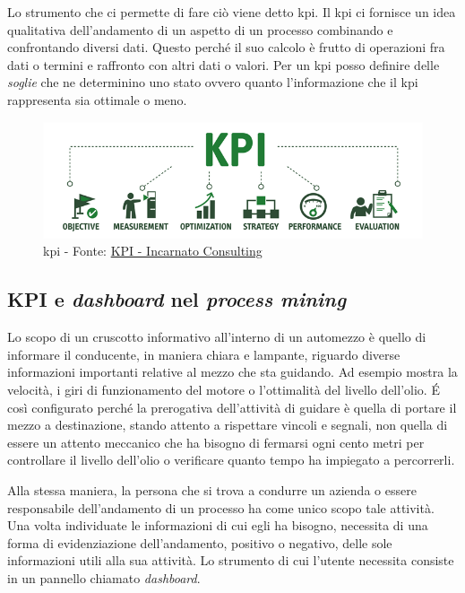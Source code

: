 Lo strumento che ci permette di fare ciò viene detto \acrshort{kpi}. Il \acrlong{kpi} ci fornisce un idea qualitativa dell'andamento di un aspetto di un processo combinando e confrontando diversi dati.
Questo perché il suo calcolo è frutto di operazioni fra dati o termini e raffronto con altri dati o valori.
Per un \acrshort{kpi} posso definire delle \emph{soglie} che ne determinino uno stato ovvero quanto l'informazione che il \acrshort{kpi} rappresenta sia ottimale o meno.
\begin{figure}[H]
    \centering
    \includegraphics[width=0.80\columnwidth]{immagini/kpi.png}
    \caption{\acrshort{kpi} - Fonte: \href{https://incarnato.consulting/kpi-cosa-utilizzarli-nella-tua-impresa/}{KPI - Incarnato Consulting}}
    \label{fig:kpi}
\end{figure}
\newpage
\subsection{KPI e \textit{dashboard} nel \textit{process mining}}
Lo scopo di un cruscotto informativo all'interno di un automezzo è quello di informare il conducente, in maniera chiara e lampante, riguardo diverse informazioni importanti relative al mezzo che sta guidando. Ad esempio mostra la velocità, i giri di funzionamento del motore o l'ottimalità del livello dell'olio. \'E così configurato perché la prerogativa dell'attività di guidare è quella di portare il mezzo a destinazione, stando attento a rispettare vincoli e segnali, non quella di essere un attento meccanico che ha bisogno di fermarsi ogni cento metri per controllare il livello dell'olio o verificare quanto tempo ha impiegato a percorrerli.

Alla stessa maniera, la persona che si trova a condurre un azienda o essere responsabile dell'andamento di un processo ha come unico scopo tale attività. Una volta individuate le informazioni di cui egli ha bisogno, necessita di una forma di evidenziazione dell'andamento, positivo o negativo, delle sole informazioni utili alla sua attività. Lo strumento di cui l'utente necessita consiste in un pannello chiamato \textit{dashboard}.

